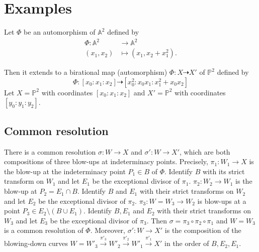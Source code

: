 \documentclass{article}
\begin{document}
\section{Examples}
Let $\Phi$ be an automorphism of $\mathbb{A}^{2}$ defined by
\begin{align*}
	\Phi: \mathbb{A}^{2} & \longrightarrow \mathbb{A}^{2}      \\
	(x_{1},x_{2})        & \longmapsto (x_{1},x_{2}+x_{1}^{2})
	.\end{align*}

Then it extends to a birational map (automorphism) $ \Phi:X\dashrightarrow X' $ of $\mathbb{P}^{2}$  defined by
\[ \Phi:[x_0:x_1:x_2]\dashrightarrow [x_0^2:x_0x_1:x_1^2+x_0x_2] \]
Let $ X=\mathbb{P}^2 $ with coordinates $ [x_0:x_1:x_2] $ and $ X'=\mathbb{P}^2 $ with coordinates $ [y_0:y_1:y_2] $.
\subsection{Common resolution}

There is a  common resolution $\sigma: W\to X$ and $\sigma':W\to X'$, which are both compositions of three blow-ups at indeterminacy points.
Precisely, $\pi_{1}:W_{1}\to X$ is the blow-up at the indeterminacy point $P_{1} \in B$ of $\Phi$. Identify $B$ with its strict transform on $W_{1}$ and let $E_{1}$ be the exceptional divisor of $\pi_{1}$.
$\pi_{2}:W_{2}\to W_{1}$ is the blow-up at $P_{2}=E_{1} \cap B$. Identify $B$ and $E_{1}$ with their strict transforms on $W_{2}$ and let $E_{2}$ be the exceptional divisor of $\pi_{2}$.
$\pi_{3}:W=W_{3}\to W_{2}$ is blow-ups at a point $P_{3} \in E_{2} \setminus (B\cup E_{1})$. Identify  $B, E_{1}$ and $E_{2}$ with their strict transforms   on $W_{3}$ and let $E_{3}$ be the exceptional divisor of $\pi_{3}$.
Then $ \sigma=\pi_{3}\circ \pi_{2} \circ \pi_{1} $ and $ W=W_3 $ is a common resolution of $\Phi$. Moreover, $ \sigma':W\to X' $ is the composition of the blowing-down curves  $W=W'_{3}\xrightarrow{\pi'_{3}} W'_{2}\xrightarrow{\pi'_{2}} W'_{1} \xrightarrow{\pi'_{1}} X'$ in the order of $ B,E_2,E_1 $.
\end{document}
